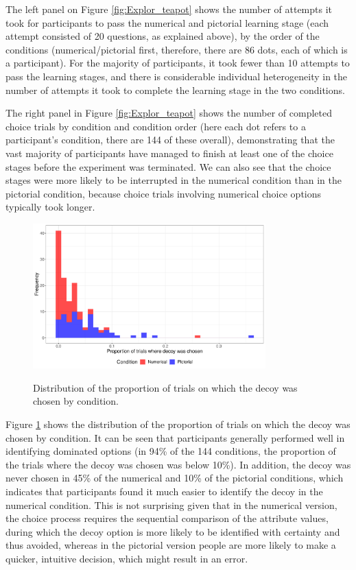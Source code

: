 \documentclass[11pt,a4paper]{article}
\begin{document}
The left panel on Figure \ref{fig:Explor_teapot} shows the number of attempts it took for participants to pass the numerical and pictorial learning stage (each attempt consisted of 20 questions, as explained above), by the order of the conditions (numerical/pictorial first, therefore, there are 86 dots, each of which is a participant). For the majority of participants, it took fewer than 10 attempts to pass the learning stages, and there is considerable individual heterogeneity in the number of attempts it took to complete the learning stage in the two conditions. 



The right panel in Figure \ref{fig:Explor_teapot} shows the number of completed choice trials by condition and condition order (here each dot refers to a participant's condition, there are 144 of these overall), demonstrating that the vast majority of participants have managed to finish at least one of the choice stages before the experiment was terminated. We can also see that the choice stages were more likely to be interrupted in the numerical condition than in the pictorial condition, because choice trials involving numerical choice options typically took longer.



\begin{figure}[htp]
\centering
\caption{Distribution of the proportion of trials on which the decoy was chosen by condition.}
\includegraphics[width=0.8\textwidth]{./Explor_teapot_dec.pdf}
\label{fig:Explor_teapot_dec}
\end{figure}

Figure \ref{fig:Explor_teapot_dec} shows the distribution of the proportion of trials on which the decoy was chosen by condition. It can be seen that participants generally performed well in identifying dominated options (in 94\% of the 144 conditions, the proportion of the trials where the decoy was chosen was below 10\%). In addition, the decoy was never chosen in 45\% of the numerical and 10\% of the pictorial conditions, which indicates that participants found it much easier to identify the decoy in the numerical condition. This is not surprising given that in the numerical version, the choice process requires the sequential comparison of the attribute values, during which the decoy option is more likely to be identified with certainty and thus avoided, whereas in the pictorial version people are more likely to make a quicker, intuitive decision, which might result in an error. 
\end{document}
